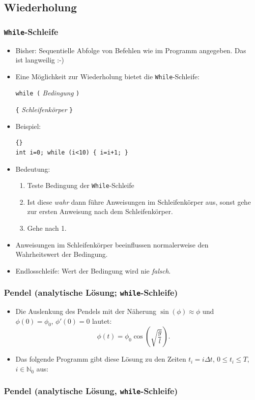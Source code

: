 \subsection{Wiederholung}

\begin{frame}[fragile]
\frametitle{\lstinline{While}-Schleife}
\begin{itemize}
\item Bisher: Sequentielle Abfolge von Befehlen wie im Programm
  angegeben. Das ist langweilig :-)
\item Eine Möglichkeit zur Wiederholung bietet die
  \lstinline{While}-Schleife:

\lstinline{while (} \textsl{Bedingung} \lstinline{)}

\lstinline!{! \textsl{Schleifenkörper} \lstinline!}!

\item Beispiel:
{\scriptsize\begin{lstlisting}{}
int i=0; while (i<10) { i=i+1; }
\end{lstlisting}}

\item Bedeutung:
\begin{enumerate}
\item Teste Bedingung der \lstinline{While}-Schleife
\item Ist diese \textsl{wahr} dann führe Anweisungen im
  Schleifenkörper aus, sonst gehe zur ersten Anweisung nach dem
  Schleifenkörper.
\item Gehe nach 1.
\end{enumerate}
\item Anweisungen im Schleifenkörper beeinflussen normalerweise den Wahrheitswert der
  Bedingung.
\item Endlosschleife: Wert der Bedingung wird nie \textsl{falsch}.
\end{itemize}
\end{frame}

\begin{frame}[fragile]
\frametitle{Pendel (analytische Lösung; \lstinline{while}-Schleife)}
\begin{itemize}
\item Die Auslenkung des Pendels mit der Näherung
  $\sin(\phi)\approx\phi$ und $\phi(0)=\phi_0$, $\phi'(0)=0$ lautet:
$$ \phi(t) = \phi_0 \cos\left(\sqrt{\frac{g}{l}}\right) .$$
\item Das folgende Programm gibt diese Lösung zu den Zeiten $t_i=i
  \Delta t$, $0\leq t_i \leq T$, $i\in\mathbb{N}_0$ aus:
\end{itemize}
\end{frame}
\begin{frame}[fragile]
\frametitle<presentation>{Pendel (analytische Lösung, \lstinline{while}-Schleife)}

\end{frame}

